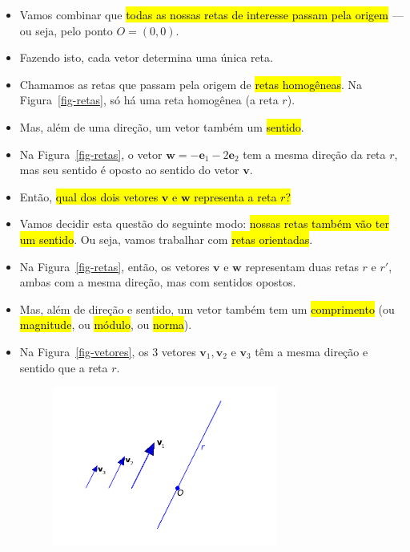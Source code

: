\documentclass[
  letterpaper,
  DIV=11,
  numbers=noendperiod]{scrreprt}
\begin{document}
\begin{itemize}
\begin{figure}[htb]
  \end{figure}
\item
  Vamos combinar que {\hl{todas as nossas retas de interesse passam pela
  origem}} --- ou seja, pelo ponto $O=(0,0)$.
\item
  Fazendo isto, cada vetor determina uma única reta.
\item
  Chamamos as retas que passam pela origem de {\hl{retas homogêneas}}.
  Na Figura~\ref{fig-retas}, só há uma reta homogênea (a reta $r$).
\item
  Mas, além de uma direção, um vetor também um {\hl{sentido}}.
\item
  Na Figura~\ref{fig-retas}, o vetor
  $\mathbf{w} = -\mathbf{e}_{1} - 2\mathbf{e}_{2}$ tem a mesma direção
  da reta $r$, mas seu sentido é oposto ao sentido do vetor
  $\mathbf{v}$.
\item
  Então, {\hl{qual dos dois vetores $\mathbf{v}$ e $\mathbf{w}$
  representa a reta $r$?}}
\item
  Vamos decidir esta questão do seguinte modo: {\hl{nossas retas também
  vão ter um sentido}}. Ou seja, vamos trabalhar com {\hl{retas
  orientadas}}.
\item
  Na Figura~\ref{fig-retas}, então, os vetores $\mathbf{v}$ e
  $\mathbf{w}$ representam duas retas $r$ e $r'$, ambas com a mesma
  direção, mas com sentidos opostos.
\item
  Mas, além de direção e sentido, um vetor também tem um
  {\hl{comprimento}} (ou {\hl{magnitude}}, ou {\hl{módulo}}, ou
  {\hl{norma}}).
\item
  Na Figura~\ref{fig-vetores}, os $3$ vetores
  $\mathbf{v}_1, \mathbf{v}_2$ e $\mathbf{v}_3$ têm a mesma direção e
  sentido que a reta $r$.

  \begin{figure}[htb]

  {\centering \includegraphics[width=0.7\textwidth,height=\textheight]{figures/fig-reta-vetores.png}

}
\end{figure}
\end{itemize}
\end{document}
